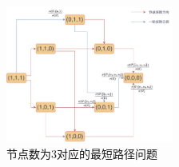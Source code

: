 \begin{figure}[ht]
    \centering
    \includegraphics[width=0.49\textwidth]{最短路径问题.pdf}
    \caption{节点数为3对应的最短路径问题}
    \label{fig:最短路径问题}
\end{figure}